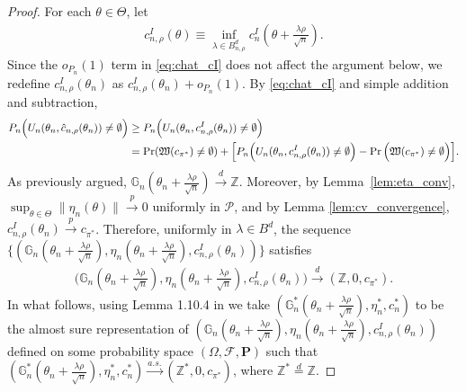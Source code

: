 \documentclass[letterpaper,11pt]{article}
\theoremstyle{myplain}
\theoremstyle{mydefinition}
\theoremstyle{myremark}
\renewcommand{\cite}{\citet}
\newcommand{\G}{\mathbb{G}}
\newcommand{\HH}{\mathbb{Z}}
\newcommand{\cP}{\mathcal{P}}
\newcommand{\larhon}{\frac{\lambda \rho }{\sqrt n}}
\newcommand{\tlarhon}{\tfrac{\lambda \rho }{\sqrt n}}
\numberwithin{equation}{section}
\numberwithin{figure}{section}
\begin{document}
\begin{appendices}
\begin{proof}
For each $\theta\in\Theta$,  let
\begin{align}
	c^{I}_{n,\rho}(\theta)\equiv\inf_{\lambda\in B^d_{n,\rho}}c^I_n(\theta+\tlarhon).
\end{align}
Since the $o_{P_n}(1)$ term in \eqref{eq:chat_cI} does not affect the argument below, we redefine $c^{I}_{n,\rho}(\theta_n)$ as $c^{I}_{n,\rho}(\theta_n)+o_{P_n}(1)$.
By \eqref{eq:chat_cI} and simple addition and subtraction,
\begin{align}
P_{n}\Big(U_{n}(\theta_{n},\hat{c}_{n,\rho}(\theta_{n}))\neq \emptyset\Big) &
\ge P_{n}\Big(U_{n}(\theta_{n},c^{I}_{n,\rho}(\theta_{n}))\neq \emptyset\Big)\notag\\
&=\Pr(\mathfrak{W}(c_{\pi^*})\ne\emptyset)+\Big[ P_n\Big(U_{n}(\theta_{n},c^{I}_{n,\rho}(\theta_{n}))\ne\emptyset\Big)-	\Pr\Big(\mathfrak{W}(c_{\pi^*})\ne\emptyset\Big)\Big].\label{eq:val_3_1}
\end{align}
As previously argued, $\mathbb G_{n}(\theta_n+\larhon)\stackrel{d}{\to} \HH$. Moreover, by Lemma~\ref{lem:eta_conv}, 
$\sup_{\theta\in\Theta}\|\eta_{n}(\theta)\|\stackrel{p}{\to} 0$ uniformly in $\cP$, and by Lemma \ref{lem:cv_convergence}, $c^I_{n,\rho}(\theta_n)\stackrel{p}{\to}c_{\pi^*}$.
 Therefore, uniformly in $\lambda\in B^d$, the sequence $\{(\mathbb G_{n}(\theta_n+\larhon),\eta_{n}(\theta_{n}+\larhon),c^{I}_{n,\rho}(\theta_n))\}$ satisfies 
\begin{align}
	\bigl(\mathbb G_{n}(\theta_n+\tlarhon),	\eta_{n}(\theta_{n}+\tlarhon),c_{n,\rho}^{I}(\theta_n)\bigr)\stackrel{d}{\to} (\HH,0,c_{\pi^*}).
\end{align}
In what follows, using Lemma 1.10.4 in \cite{Vaart_Wellner2000aBK} we take $(\G^*_{n}(\theta_n+\larhon),\eta^*_{n}, c^*_{n})$ to be the almost sure representation of $(\mathbb G_{n}(\theta_n+\larhon),\eta_{n}(\theta_{n}+\larhon),c_{n,\rho}^{I}(\theta_n))$ defined on some probability space $(\Omega,\mathcal F,\mathbf P)$ such that
 $(\mathbb G^*_{n}(\theta_n+\larhon),\eta^*_{n}, c^*_{n})\stackrel{a.s.}{\to}(\HH^*,0, c_{\pi^*})$, where $\HH^*\stackrel{d}{=}\HH$. 



\end{proof}
\end{appendices}
\end{document}
